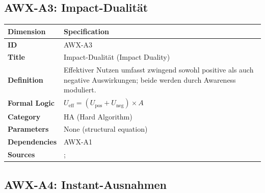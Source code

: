 
\subsection{AWX-A3: Impact-Dualität}

\begin{table}[htbp]
\small
\begin{tabular}{p{3cm}p{11cm}}
\toprule
\textbf{Dimension} & \textbf{Specification} \\
\midrule
\textbf{ID} & AWX-A3 \\
\textbf{Title} & Impact-Dualität (Impact Duality) \\
\textbf{Definition} & Effektiver Nutzen umfasst zwingend sowohl positive als auch negative Auswirkungen; beide werden durch Awareness moduliert. \\
\textbf{Formal Logic} & $U_{\text{eff}} = (U_{\text{pos}} + U_{\text{neg}}) \times A$ \\
\textbf{Category} & HA (Hard Algorithm) \\
\textbf{Parameters} & None (structural equation) \\
\textbf{Dependencies} & AWX-A1 \\
\textbf{Sources} & \citet{kahneman1991loss}; \citet{PAP-tversky1992advances} \\
\bottomrule
\end{tabular}
\end{table}


\subsection{AWX-A4: Instant-Ausnahmen}

